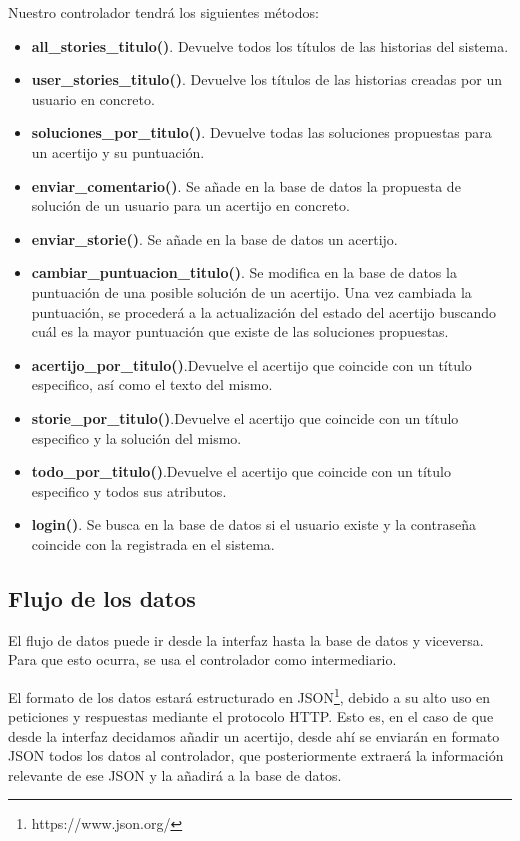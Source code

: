 Nuestro controlador tendrá los siguientes métodos:

\begin{itemize}
    \item \textbf{all\_stories\_titulo()}. Devuelve todos los títulos de las historias del sistema.
    \item \textbf{user\_stories\_titulo()}. Devuelve los títulos de las historias creadas por un usuario en concreto.
    \item \textbf{soluciones\_por\_titulo()}. Devuelve todas las soluciones propuestas para un acertijo y su puntuación.
    \item \textbf{enviar\_comentario()}. Se añade en la base de datos la propuesta de solución de un usuario para un acertijo en concreto.
    \item \textbf{enviar\_storie()}. Se añade en la base de datos un acertijo.
    \item \textbf{cambiar\_puntuacion\_titulo()}. Se modifica en la base de datos la puntuación de una posible solución de un acertijo. Una vez cambiada la puntuación, se procederá a la actualización del estado del acertijo buscando cuál es la mayor puntuación que existe de las soluciones propuestas.
    \item \textbf{acertijo\_por\_titulo()}.Devuelve el acertijo que coincide con un título especifico, así como el texto del mismo.
    \item \textbf{storie\_por\_titulo()}.Devuelve el acertijo que coincide con un título especifico y  la solución del mismo.
    \item \textbf{todo\_por\_titulo()}.Devuelve el acertijo que coincide con un título especifico y todos sus atributos.
    \item \textbf{login()}. Se busca en la base de datos si el usuario existe y la contraseña coincide con la registrada en el sistema.
\end{itemize}

\subsection{Flujo de los datos}

El flujo de datos puede ir desde la interfaz hasta la base de datos y viceversa. Para que esto ocurra, se usa el controlador como intermediario. 

El formato de los datos estará estructurado en JSON\footnote{https://www.json.org/}, debido a su alto uso en peticiones y respuestas mediante el protocolo HTTP.  Esto es, en el caso de que desde la interfaz decidamos añadir un acertijo, desde ahí se enviarán en formato JSON todos los datos al controlador, que posteriormente extraerá la información relevante de ese JSON y la añadirá a la base de datos.


